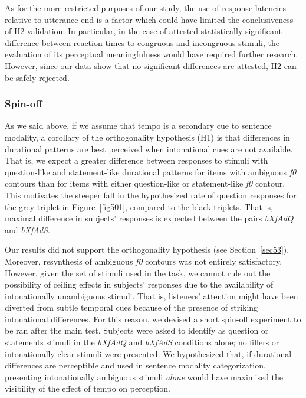 As for the more restricted purposes of our study, the use of response latencies relative to utterance end is a factor which could have limited the conclusiveness of H2 validation. In particular, in the case of attested statistically significant difference between reaction times to congruous and incongruous stimuli, the evaluation of its perceptual meaningfulness would have required further research. However, since our data show that no significant differences are attested, H2 can be safely rejected.

\subsubsection{Spin-off}\label{sec5413}
As we said above, if we assume that tempo is a secondary cue to sentence modality, a corollary of the orthogonality hypothesis (H1) is that differences in durational patterns are best perceived when intonational cues are not available. That is, we expect a greater difference between responses to stimuli with question-like and statement-like durational patterns for items with ambiguous \textit{f0} contours than for items with either question-like or statement-like \textit{f0} contour. This motivates the steeper fall in the hypothesized rate of question responses for the grey triplet in Figure~\ref{fig501}, compared to the black triplets. That is, maximal difference in subjects' responses is expected between the pairs \textit{bXfAdQ} and \textit{bXfAdS}.

Our results did not support the orthogonality hypothesis (see Section~\ref{sec53}). Moreover, resynthesis of ambiguous \textit{f0} contours was not entirely satisfactory. However, given the set of stimuli used in the task, we cannot rule out the possibility of ceiling effects in subjects' responses due to the availability of intonationally unambiguous stimuli. That is, listeners' attention might have been diverted from subtle temporal cues because of the presence of striking intonational differences. For this reason, we devised a short spin-off experiment to be ran after the main test. Subjects were asked to identify as question or statements stimuli in the \textit{bXfAdQ} and \textit{bXfAdS} conditions alone; no fillers or intonationally clear stimuli were presented. We hypothesized that, if durational differences are perceptible and used in sentence modality categorization, presenting intonationally ambiguous stimuli \textit{alone} would have maximised the visibility of the effect of tempo on perception.

